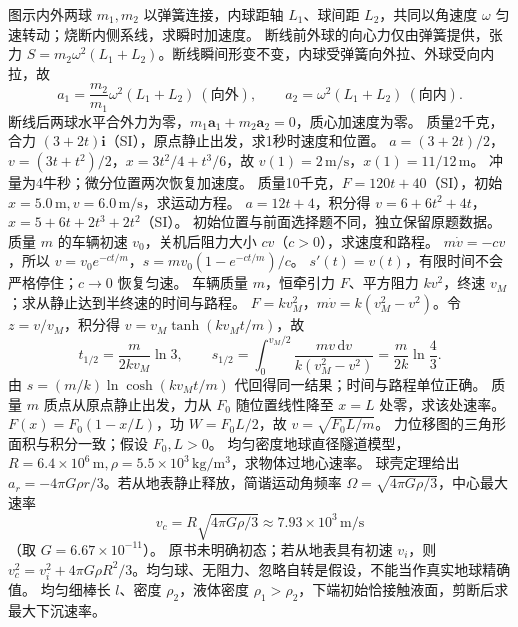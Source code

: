 \problemtext 图示内外两球 $m_1,m_2$ 以弹簧连接，内球距轴 $L_1$、球间距 $L_2$，共同以角速度 $\omega$ 匀速转动；烧断内侧系线，求瞬时加速度。
\workings 断线前外球的向心力仅由弹簧提供，张力 $S=m_2\omega^2(L_1+L_2)$。断线瞬间形变不变，内球受弹簧向外拉、外球受向内拉，故
\[
a_1=\frac{m_2}{m_1}\omega^2(L_1+L_2)\ (\text{向外}),\qquad
a_2=\omega^2(L_1+L_2)\ (\text{向内}).
\]
\crosscheck 断线后两球水平合外力为零，$m_1\bm a_1+m_2\bm a_2=0$，质心加速度为零。
\problemtext 质量2千克，合力 $(3+2t)\bm i$（SI），原点静止出发，求1秒时速度和位置。
\workings $a=(3+2t)/2$，$v=(3t+t^2)/2$，$x=3t^2/4+t^3/6$，故 $v(1)=2\,\mathrm{m/s}$，$x(1)=11/12\,\mathrm m$。
\crosscheck 冲量为4牛秒；微分位置两次恢复加速度。
\problemtext 质量10千克，$F=120t+40$（SI），初始 $x=5.0\,\mathrm m,v=6.0\,\mathrm{m/s}$，求运动方程。
\workings $a=12t+4$，积分得 $v=6+6t^2+4t$，$x=5+6t+2t^3+2t^2$（SI）。
\crosscheck 初始位置与前面选择题不同，独立保留原题数据。
\problemtext 质量 $m$ 的车辆初速 $v_0$，关机后阻力大小 $cv$（$c>0$），求速度和路程。
\workings $m\dot v=-cv$，所以 $v=v_0e^{-ct/m}$，$s=mv_0(1-e^{-ct/m})/c$。
\crosscheck $s'(t)=v(t)$，有限时间不会严格停住；$c\to0$ 恢复匀速。
\problemtext 车辆质量 $m$，恒牵引力 $F$、平方阻力 $kv^2$，终速 $v_M$；求从静止达到半终速的时间与路程。
\workings $F=kv_M^2$，$m\dot v=k(v_M^2-v^2)$。令 $z=v/v_M$，积分得 $v=v_M\tanh(kv_Mt/m)$，故
\[
t_{1/2}=\frac{m}{2kv_M}\ln3,\qquad
s_{1/2}=\int_0^{v_M/2}\frac{mv\,\mathrm dv}{k(v_M^2-v^2)}
=\frac{m}{2k}\ln\frac43.
\]
\crosscheck 由 $s=(m/k)\ln\cosh(kv_Mt/m)$ 代回得同一结果；时间与路程单位正确。
\problemtext 质量 $m$ 质点从原点静止出发，力从 $F_0$ 随位置线性降至 $x=L$ 处零，求该处速率。
\workings $F(x)=F_0(1-x/L)$，功 $W=F_0L/2$，故 $v=\sqrt{F_0L/m}$。
\crosscheck 力位移图的三角形面积与积分一致；假设 $F_0,L>0$。
\problemtext 均匀密度地球直径隧道模型，$R=6.4\times10^6\,\mathrm m,\rho=5.5\times10^3\,\mathrm{kg/m^3}$，求物体过地心速率。
\workings 球壳定理给出 $a_r=-4\pi G\rho r/3$。若从地表静止释放，简谐运动角频率 $\Omega=\sqrt{4\pi G\rho/3}$，中心最大速率
\[
v_c=R\sqrt{4\pi G\rho/3}\approx7.93\times10^3\,\mathrm{m/s}
\]
（取 $G=6.67\times10^{-11}$）。
\crosscheck 原书未明确初态；若从地表具有初速 $v_i$，则 $v_c^2=v_i^2+4\pi G\rho R^2/3$。均匀球、无阻力、忽略自转是假设，不能当作真实地球精确值。
\problemtext 均匀细棒长 $l$、密度 $\rho_2$，液体密度 $\rho_1>\rho_2$，下端初始恰接触液面，剪断后求最大下沉速率。
